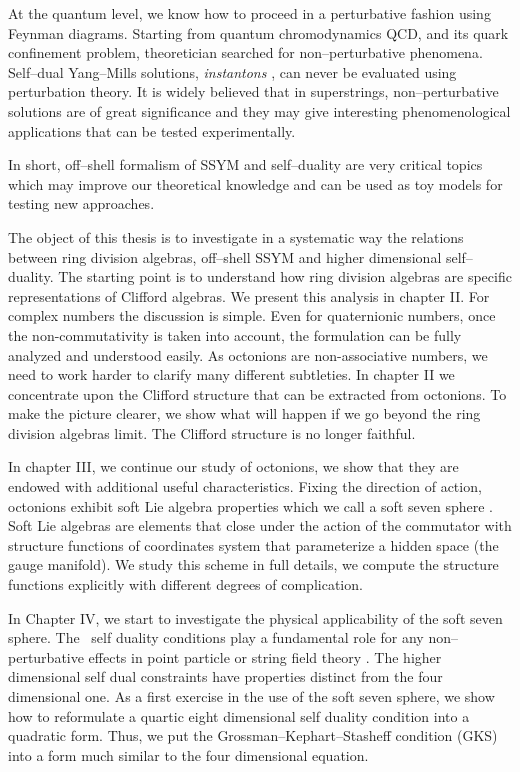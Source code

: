\documentclass[a4paper,12pt]{book}
\begin{document}
At the quantum level, we know how to proceed in a perturbative fashion using
Feynman diagrams. Starting from quantum chromodynamics QCD, and its quark
confinement problem, theoretician searched for non--perturbative phenomena.
Self--dual Yang--Mills solutions, \emph{instantons} \cite{bpst}\cite{hooft1}%
, can never be evaluated using perturbation theory. It is widely believed
that in superstrings, non--perturbative solutions are of great significance
and they may give interesting phenomenological applications that can be
tested experimentally.

In short, off--shell formalism of SSYM and self--duality are very critical
topics which may improve our theoretical knowledge and can be used as toy
models for testing new approaches.

The object of this thesis is to investigate in a systematic way the
relations between ring division algebras, off--shell SSYM and higher
dimensional self--duality. The starting point is to understand how ring
division algebras are specific representations of Clifford algebras. We
present this analysis in chapter II. For complex numbers the discussion is
simple. Even for quaternionic numbers, once the non-commutativity is taken
into account, the formulation can be fully analyzed and understood easily.
As octonions are non-associative numbers, we need to work harder to clarify
many different subtleties. In chapter II we concentrate upon the Clifford
structure that can be extracted from octonions. To make the picture clearer,
we show what will happen if we go beyond the ring division algebras limit.
The Clifford structure is no longer faithful.

In chapter III, we continue our study of octonions, we show that they are
endowed with additional useful characteristics. Fixing the direction of
action, octonions exhibit soft Lie algebra properties which we call a soft
seven sphere \cite{estps}\cite{soh}. Soft Lie algebras are elements that
close under the action of the commutator with structure functions of
coordinates system that parameterize a hidden space (the gauge manifold). We
study this scheme in full details, we compute the structure functions
explicitly with different degrees of complication.

In Chapter IV, we start to investigate the physical applicability of the
soft seven sphere. The \ self duality conditions play a fundamental role for
any non--perturbative effects in point particle or string field theory \cite
{duality}. The higher dimensional self dual constraints have properties
distinct from the four dimensional one. As a first exercise in the use of
the soft seven sphere, we show how to reformulate a quartic eight
dimensional self duality condition into a quadratic form. Thus, we put the
Grossman--Kephart--Stasheff condition (GKS) \cite{gks} into a form much
similar to the four dimensional equation.
\end{document}
